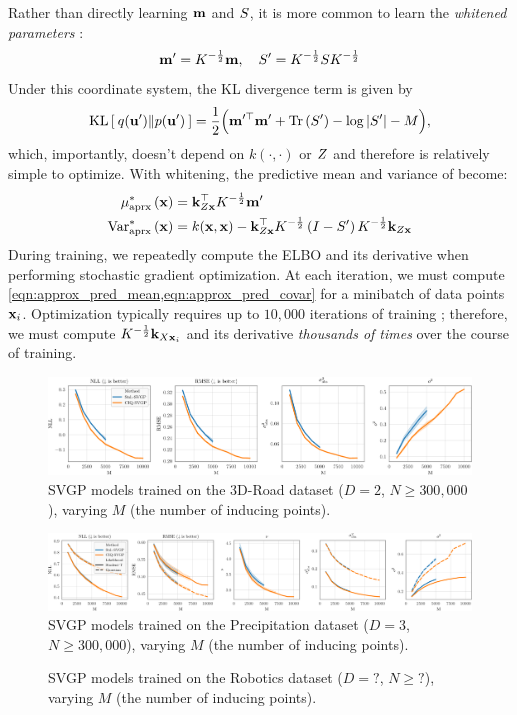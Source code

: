 Rather than directly learning $\mathbf{m}$ and $S$, it is more common to learn the \emph{whitened parameters} \cite{kuss2005assessing,matthews2017scalable}:
\[ \mathbf{m}' = K^{-\frac 1 2} \mathbf{m}, \quad S' = K^{-\frac 1 2} S K^{-\frac 1 2} \]
Under this coordinate system, the KL divergence term is given by
%
\begin{equation}
	\kl{ q(\bu') }{ p(\bu') } = \frac{1}{2} \Bigl( \bm^{\prime \top} \bm' + \tr{ \bS' } - \log \vert \bS' \vert - M \Bigr),
	\label{eqn:kldiv_whitened}
\end{equation}
%
which, importantly, doesn't depend on $k(\cdot,\cdot)$ or $Z$ and therefore is relatively simple to optimize.
With whitening, the predictive mean and variance of become:
%
\begin{align}
  \mu^*_\text{aprx} \left( \mathbf{x} \right) &= \mathbf{k}_{Z\mathbf{x}}^\top K^{-\frac 1 2} \mathbf{m}'
  \label{eqn:approx_pred_mean} \\
  \text{Var}^*_\text{aprx} \left( \mathbf{x} \right) &= k(\mathbf{x}, \mathbf{x}) -
    \mathbf{k}_{Z\mathbf{x}}^\top K^{-\frac 1 2} \left( I - S' \right) K^{-\frac 1 2} \mathbf{k}_{Z\mathbf{x}}
  \label{eqn:approx_pred_covar}
\end{align}
%
During training, we repeatedly compute the ELBO and its derivative when performing stochastic gradient optimization.
At each iteration, we must compute \cref{eqn:approx_pred_mean,eqn:approx_pred_covar} for a minibatch of data points $\mathbf{x}_i$.
Optimization typically requires up to $10,\!000$ iterations of training \citep[e.g.][]{salimbeni2018natural};
therefore, we must compute $K^{- \frac 1 2} \mathbf{k}_{X \mathbf{x}_i}$ and its derivative \emph{thousands of times} over the course of training.


\begin{figure}[t!]
  \centering
  \includegraphics[width=\linewidth]{figures/3droad.pdf}
  \caption{
    SVGP models trained on the 3D-Road dataset ($D=2$, $N\geq300,\!000$), varying $M$ (the number of inducing points).
  }
  \label{fig:3droad}
\end{figure}

\begin{figure}[t!]
  \centering
  \includegraphics[width=\linewidth]{figures/precip.pdf}
  \caption{
    SVGP models trained on the Precipitation dataset ($D=3$, $N\geq300,\!000$), varying $M$ (the number of inducing points).
  }
  \label{fig:precip}
\end{figure}

\begin{figure}[t!]
  \centering
  \caption{
    SVGP models trained on the Robotics dataset ($D=?$, $N\geq?$), varying $M$ (the number of inducing points).
  }
  \label{fig:robotics}
\end{figure}

